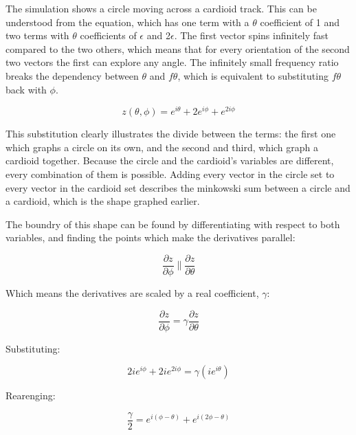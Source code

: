 \documentclass[12pt, a4paper, oneside]{report}
\begin{document}
The simulation shows a circle moving across a cardioid track. This can be understood from the equation, which has one term with a $\theta$ coefficient of 1 and two terms with $\theta$ coefficients of $\epsilon$ and 2$\epsilon$. The first vector spins infinitely fast compared to the two others, which means that for every orientation of the second two vectors the first can explore any angle. The infinitely small frequency ratio breaks the dependency between $\theta$ and $f\theta$, which is equivalent to substituting $f\theta$ back with $\phi$.

\begin{equation}
  z(\theta, \phi) = e^{i\theta} + 2e^{i\phi} + e^{2i\phi}
  \label{eq:rho1=2,rho2=1,f1=epsilon,f2=2*epsilon}
\end{equation}

This substitution clearly illustrates the divide between the terms: the first one which graphs a circle on its own, and the second and third, which graph a cardioid together. Because the circle and the cardioid's variables are different, every combination of them is possible. Adding every vector in the circle set to every vector in the cardioid set describes the minkowski sum between a circle and a cardioid, which is the shape graphed earlier.

The boundry of this shape can be found by differentiating with respect to both variables, and finding the points which make the derivatives parallel:

\begin{equation*}
  \frac{\partial z}{\partial \phi} \parallel \frac{\partial z}{\partial \theta}
\end{equation*}

Which means the derivatives are scaled by a real coefficient, $\gamma$:

\begin{equation*}
  \frac{\partial z}{\partial \phi} = \gamma \frac{\partial z}{\partial \theta}
\end{equation*}

Substituting:

\begin{equation*}
  2ie^{i\phi} + 2ie^{2i\phi} = \gamma (ie^{i\theta})
\end{equation*}

Rearenging:

\begin{equation*}
  \frac{\gamma}{2} = e^{i(\phi - \theta)} + e^{i(2\phi - \theta)}
\end{equation*}
\end{document}
